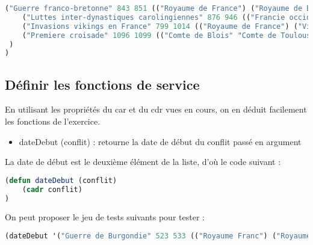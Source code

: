 \documentclass[a4paper, 12pt]{article}
\begin{document}
\begin{lstlisting}[language=Lisp]
    ("Guerre franco-bretonne" 843 851 (("Royaume de France") ("Royaume de Bretagne" "Vikings")) ("Royaume de Bretagne"))
    ("Luttes inter-dynastiques carolingiennes" 876 946 (("Francie occidentale" "Francie orientale") ("Royaume de Bourgogne" "Francie orientale")) ("Ardennes" "Saone-et-Loire" "Rhenanie-Palatinat" "Aisne"))
    ("Invasions vikings en France" 799 1014 (("Royaume de France") ("Vikings")) ("Normandie" "Bretagne"))
    ("Premiere croisade" 1096 1099 (("Comte de Blois" "Comte de Toulouse" "Comte de Boulogne" "Marquisat de Provence" "Comte de Flandre" "Duche de Normandie" "Diocese du Puy-en-Velay" "Comte de Vermandois" "Republique de Genes" "Duche de Basse-Lotharingie" "Principaute de Tarente" "Empire byzantin" "Royaume de Petite-Armenie" "Croises" "Royaume de France") ("Sultanat de Roum" "Danichmendides" "Califat fatimide")) ("Terre sainte"))
 )
)
\end{lstlisting}
\vspace{5mm}

\subsection{Définir les fonctions de service}
\vspace{3mm}

En utilisant les propriétés du car et du cdr vues en cours, on en déduit facilement les fonctions de l’exercice.
\vspace{3mm}

\begin{itemize}[label=\textbullet]
    \item dateDebut (conflit) : retourne la date de début du conflit passé en argument
    \end{itemize}
\vspace{2mm}

La date de début est le deuxième élément de la liste, d’où le code suivant :
\vspace{2mm}

\begin{lstlisting}[language=Lisp]
(defun dateDebut (conflit)
    (cadr conflit)
)
\end{lstlisting}
\vspace{2mm}

On peut proposer le jeu de tests suivants pour tester :
\vspace{2mm}

\begin{lstlisting}[language=Lisp]
(dateDebut '("Guerre de Burgondie" 523 533 (("Royaume Franc") ("Royaume des Burgondes")) ("Vezeronce" "Arles"))) ; renvoie 523
\end{lstlisting}
\end{document}
